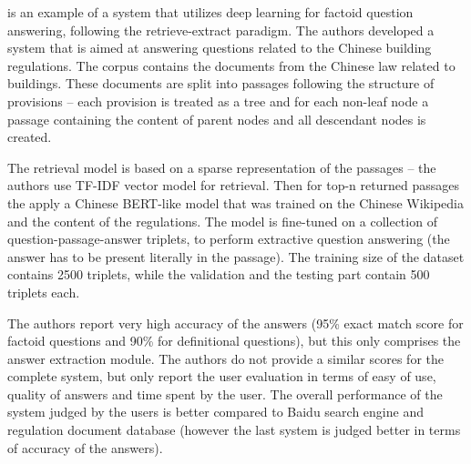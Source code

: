 \cite{zhong2020building} is an example of a system that utilizes deep learning for factoid
question answering, following the retrieve-extract paradigm. The authors developed a system
that is aimed at answering questions related to the Chinese building regulations. 
The corpus contains the documents from the Chinese law related to buildings. These documents
are split into passages following the structure of provisions -- each provision is treated 
as a tree and for each non-leaf node a passage containing the content of parent nodes and all 
descendant nodes is created.

The retrieval model is based on a sparse representation of the passages -- the authors use TF-IDF 
\cite{manning1999foundations} vector model for retrieval. Then for top-n returned passages the
apply a Chinese BERT-like model that was trained on the Chinese Wikipedia and the content of the 
regulations. The model is fine-tuned on a collection of question-passage-answer triplets, to 
perform extractive question answering (the answer has to be present literally in the passage).
The training size of the dataset contains 2500 triplets, while the validation and the testing
part contain 500 triplets each.

The authors report very high accuracy of the answers (95\% exact match score for factoid questions 
and 90\% for definitional questions), but this only comprises the answer extraction module. 
The authors do not provide a similar scores for the complete system, but only report the user 
evaluation in terms of easy of use, quality of answers and time spent by the user. The overall performance 
of the system judged by the users is better compared to Baidu search engine and regulation document 
database (however the last system is judged better in terms of accuracy of the answers).